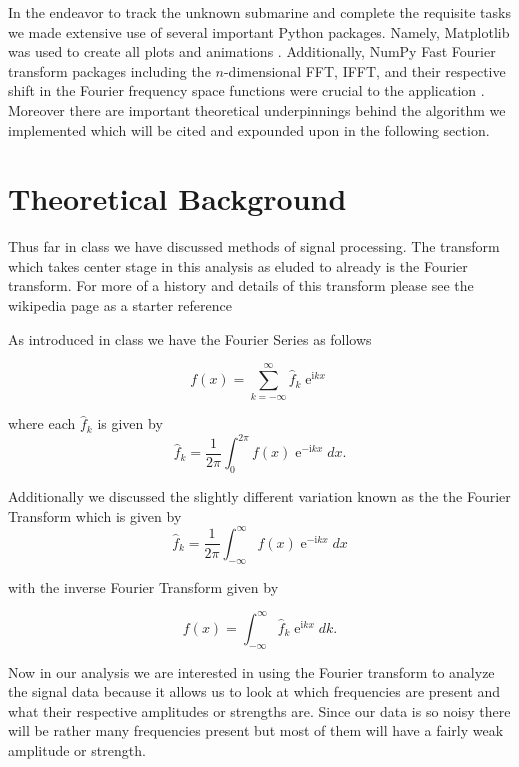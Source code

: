 \documentclass[11pt]{amsart}
\newcommand{\I}{\mathrm{i}}
\DeclareMathOperator{\E}{e}
\begin{document}
In the endeavor to track the unknown submarine and complete the requisite tasks we made extensive use of several important Python packages.
Namely, Matplotlib was used to create all plots and animations \cite{Hunter:2007}.
Additionally, NumPy Fast Fourier transform packages including the $n$-dimensional FFT, IFFT, and their respective shift in the Fourier frequency space functions were crucial to the application \cite{harris2020array}.
Moreover there are important theoretical underpinnings behind the algorithm we implemented which will be cited and expounded upon in the following section.

\section{Theoretical Background}\label{sec:theory}
Thus far in class we have discussed methods of signal processing.
The transform which takes center stage in this analysis as eluded to already is the Fourier transform.
For more of a history and details of this transform please see the wikipedia page as a starter reference \cite{wikipedia_fourier_transform}

As introduced in class we have the Fourier Series as follows

\begin{equation}
f(x) = \sum_{k=-\infty}^\infty \hat f_k \E^{\I k x}
\label{eq:fourier_series}
\end{equation}

where each $\hat f_k$ is given by
$$
\hat f_k  = \frac 1 {2 \pi} \int_0^{2 \pi} f(x) \E^{-\I k x} dx.
$$

Additionally we discussed the slightly different variation known as the the Fourier Transform which is given by
\begin{equation}
\hat f_k = \frac 1 {2 \pi} \int_{-\infty}^\infty f(x) \E^{-\I k x} dx
\label{eq:fourier_transform}
\end{equation}

with the inverse Fourier Transform given by

\begin{equation}
f(x) = \int_{-\infty}^\infty \hat f_k \E^{\I k x} dk.
\label{eq:inv_fourier_transform}
\end{equation}

Now in our analysis we are interested in using the Fourier transform to analyze the signal data because it allows us to look at which frequencies are present and what their respective amplitudes or strengths are.
Since our data is so noisy there will be rather many frequencies present but most of them will have a fairly weak amplitude or strength.
\end{document}
